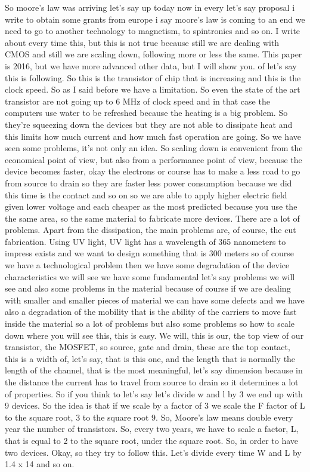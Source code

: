 So moore's law was arriving let's say up today now in every let's say proposal i write to obtain some grants from europe i say moore's law is coming to an end we need to go to another technology to magnetism, to spintronics and so on. I write about every time this, but this is not true because still we are dealing with CMOS and still we are scaling down, following more or less the same. This paper is 2016, but we have more advanced other data, but I will show you. of let's say this is following. So this is the transistor of chip that is increasing and this is the clock speed. So as I said before we have a limitation. So even the state of the art transistor are not going up to 6 MHz of clock speed and in that case the computers use water to be refreshed because the heating is a big problem. So they're squeezing down the devices but they are not able to dissipate heat and this limits how much current and how much fast operation are going. So we have seen some problems, it's not only an idea.
So scaling down is convenient from the economical point of view, but also from a performance point of view, because the device becomes faster, okay the electrons or course has to make a less road to go from source to drain so they are faster less power consumption because we did this time is the contact and so on so we are able to apply higher electric field given lower voltage and each cheaper as the most predicted because you use the the same area, so the same material to fabricate more devices. There are a lot of problems. Apart from the dissipation, the main problems are, of course, the cut fabrication. Using UV light, UV light has a wavelength of 365 nanometers to impress exists and we want to design something that is 300 meters so of course we have a technological problem then we have some degradation of the device characteristics we will see we have some fundamental let's say problems we will see and also some problems in the material because of course if we are dealing with smaller and smaller pieces of material we can have some defects and we have also a degradation of the mobility that is the ability of the carriers to move fast inside the material so a lot of problems but also some problems so how to scale down where you will see this, this is easy.
We will, this is our, the top view of our transistor, the MOSFET, so source, gate and drain, these are the top contact, this is a width of, let's say, that is this one, and the length that is normally the length of the channel, that is the most meaningful, let's say dimension because in the distance the current has to travel from source to drain so it determines a lot of properties. So if you think to let's say let's divide w and l by 3 we end up with 9 devices. So the idea is that if we scale by a factor of 3 we scale the F factor of L to the square root, 3 to the square root 9. So, Moore's law means double every year the number of transistors. So, every two years, we have to scale a factor, L, that is equal to 2 to the square root, under the square root. So, in order to have two devices. Okay, so they try to follow this. Let's divide every time W and L by 1.4 x 14 and so on.
